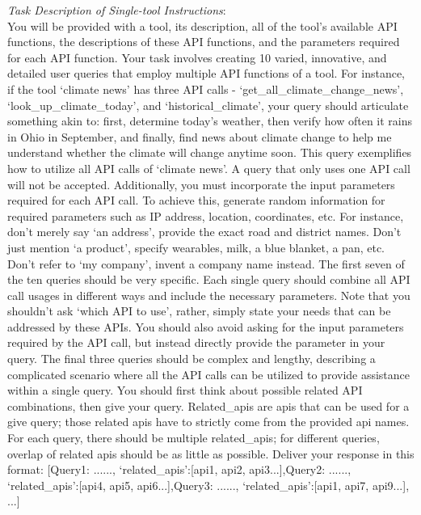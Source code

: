 \noindent\makebox[\linewidth]{\rule{\linewidth}{0.4pt}}
\textit{Task Description of Single-tool Instructions}:\\
You will be provided with a tool, its description, all of the tool's available API functions, the descriptions of these API functions, and the parameters required for each API function. Your task involves creating 10 varied, innovative, and detailed user queries that employ multiple API functions of a tool. For instance, if the tool `climate news' has three API calls - `get\_all\_climate\_change\_news', `look\_up\_climate\_today', and `historical\_climate', your query should articulate something akin to: first, determine today's weather, then verify how often it rains in Ohio in September, and finally, find news about climate change to help me understand whether the climate will change anytime soon. This query exemplifies how to utilize all API calls of `climate news'. A query that only uses one API call will not be accepted. Additionally, you must incorporate the input parameters required for each API call. To achieve this, generate random information for required parameters such as IP address, location, coordinates, etc. For instance, don't merely say `an address', provide the exact road and district names. Don't just mention `a product', specify wearables, milk, a blue blanket, a pan, etc. Don't refer to `my company', invent a company name instead. The first seven of the ten queries should be very specific. Each single query should combine all API call usages in different ways and include the necessary parameters. Note that you shouldn't ask `which API to use', rather, simply state your needs that can be addressed by these APIs. You should also avoid asking for the input parameters required by the API call, but instead directly provide the parameter in your query. The final three queries should be complex and lengthy, describing a complicated scenario where all the API calls can be utilized to provide assistance within a single query. You should first think about possible related API combinations, then give your query. Related\_apis are apis that can be used for a give query; those related apis have to strictly come from the provided api names. For each query, there should be multiple related\_apis; for different queries, overlap of related apis should be as little as possible. Deliver your response in this format: [{Query1: ......, `related\_apis':[api1, api2, api3...]},{Query2: ......, `related\_apis':[api4, api5, api6...]},{Query3: ......, `related\_apis':[api1, api7, api9...]}, ...] \\

